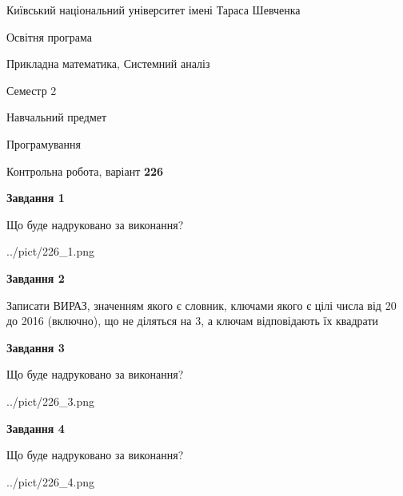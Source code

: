 \documentclass[12pt, ukrainian]{article}
\begin{document}
{{\begin {small}\par
{ \center  Київський національний університет імені Тараса Шевченка \par}
{\parbox {5 cm}{Освітня програма \hfill}{\parbox {8 cm}{Прикладна математика, Системний аналіз \hfill}}\parbox {5 cm}{\hfill Семестр 2}}\par
{\parbox {5 cm} {Навчальний предмет \hfill}\parbox {7 cm}{Програмування \hfill}\parbox {6cm}{\hfill}\par}\vspace{-7pt} \end{small}}{\center Контрольна робота, варіант  \No \textbf
{ 226 }\par}}
{
\begin {large}
{\begin {center}\textbf{Завдання 1}\end {center}}\par
Що буде надруковано за виконання?\par\par
\begin{center}
	{../pict/226_1.png}
\end{center}
\newpage

{\begin {center}\textbf{Завдання 2}\end {center}}\par
Записати ВИРАЗ, значенням якого є словник, ключами якого є цілі числа від 20 до 2016 (включно), що не діляться на 3, а ключам відповідають їх квадрати\par
\newpage

{\begin {center}\textbf{Завдання 3}\end {center}}\par
Що буде надруковано за виконання?
\begin{center}
	{../pict/226_3.png}
\end{center}
\newpage

{\begin {center}\textbf{Завдання 4}\end {center}}\par
Що буде надруковано за виконання?\par
\begin{center}
	{../pict/226_4.png}
\end{center}
\newpage


\end{large}}
\end{document}
